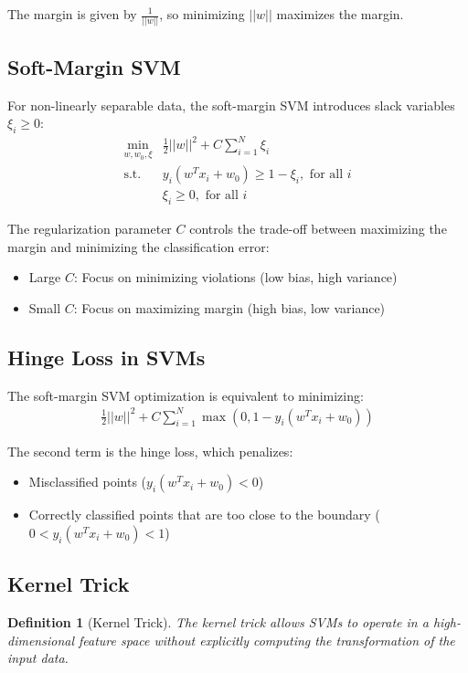 \documentclass{article}
\newtheorem{definition}{Definition}
\begin{document}
The margin is given by $\frac{1}{||w||}$, so minimizing $||w||$ maximizes the margin.

\subsection{Soft-Margin SVM}
For non-linearly separable data, the soft-margin SVM introduces slack variables $\xi_i \geq 0$:
\begin{align}
\min_{w, w_0, \xi} &\frac{1}{2}||w||^2 + C\sum_{i=1}^{N}\xi_i\\
\text{s.t. } &y_i(w^Tx_i + w_0) \geq 1 - \xi_i, \text{ for all } i\\
&\xi_i \geq 0, \text{ for all } i
\end{align}

The regularization parameter $C$ controls the trade-off between maximizing the margin and minimizing the classification error:
\begin{itemize}
\item Large $C$: Focus on minimizing violations (low bias, high variance)
\item Small $C$: Focus on maximizing margin (high bias, low variance)
\end{itemize}

\subsection{Hinge Loss in SVMs}
The soft-margin SVM optimization is equivalent to minimizing:
\begin{align}
\frac{1}{2}||w||^2 + C\sum_{i=1}^{N}\max(0, 1 - y_i(w^Tx_i + w_0))
\end{align}

The second term is the hinge loss, which penalizes:
\begin{itemize}
\item Misclassified points ($y_i(w^Tx_i + w_0) < 0$)
\item Correctly classified points that are too close to the boundary ($0 < y_i(w^Tx_i + w_0) < 1$)
\end{itemize}

\subsection{Kernel Trick}
\begin{definition}[Kernel Trick]
The kernel trick allows SVMs to operate in a high-dimensional feature space without explicitly computing the transformation of the input data.
\end{definition}
\end{document}
